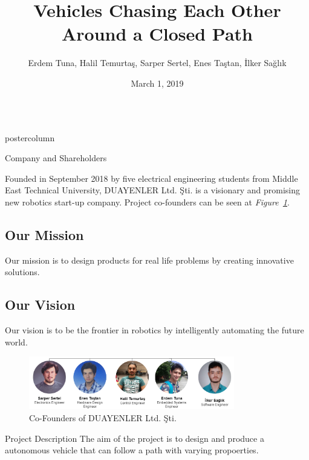 \documentclass{beamer}
\title{\huge Vehicles Chasing Each Other \\Around a Closed Path}
\author{Erdem Tuna, Halil Temurtaş, Sarper Sertel, Enes Taştan, İlker Sağlık}
\institute[ETH]{\LARGE DUAYENLER Ltd. Şti. 
}
\date{March 1, 2019}
\newlength{\columnheight}
\begin{document}
\begin{frame}
\begin{columns}
	\begin{column}{.5\textwidth}
		\begin{beamercolorbox}[center]{postercolumn}
			\begin{minipage}{.98\textwidth}  %
				\parbox[t][\columnheight]{\textwidth}{ %
					\begin{myblock}{Company and Shareholders}
						
						Founded in September 2018 by five electrical engineering students from Middle East Technical University, DUAYENLER Ltd. Şti. is a visionary and promising new robotics start-up company. Project co-founders can be seen at \textit{Figure~\ref{fig:team}}.
												
						\subsection{Our Mission}
						Our mission is to design products for real life problems by creating innovative solutions.
						
						\subsection{Our Vision}
						Our vision is to be the frontier in robotics by intelligently automating the future world.

			\begin{figure}
				\centering
				\includegraphics[width=0.8\textwidth]{img/company-tree2}
				\caption{Co-Founders of DUAYENLER Ltd. Şti.}
				\label{fig:team}
				\-\vspace{-2.0cm}
			\end{figure}
					\-\vspace{-1.5cm}
					\end{myblock} %
					\vspace{-0.4em}
					\begin{myblock}{Project Description}
						The aim of the project is to design and produce a autonomous vehicle that can follow a path with varying propoerties.
						

\end{myblock}}
\end{minipage}
\end{beamercolorbox}
\end{column}
\end{columns}
\end{frame}
\end{document}
